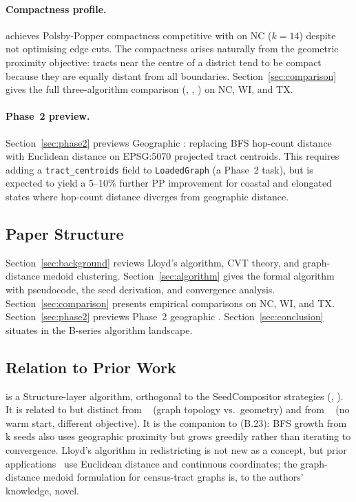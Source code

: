 \paragraph{Compactness profile.}
\cvd{} achieves Polsby-Popper compactness competitive with \metis{}
on NC ($k=14$) despite not optimising edge cuts.
The compactness arises naturally from the geometric proximity objective: tracts
near the centre of a district tend to be compact because they are equally
distant from all boundaries.
Section~\ref{sec:comparison} gives the full three-algorithm comparison
(\cvd{}, \metis{}, \sa{}) on NC, WI, and TX.

\paragraph{Phase~2 preview.}
Section~\ref{sec:phase2} previews Geographic \cvd{}: replacing BFS hop-count
distance with Euclidean distance on EPSG:5070 projected tract centroids.
This requires adding a \texttt{tract\_centroids} field to \texttt{LoadedGraph}
(a Phase~2 task), but is expected to yield a 5--10\% further PP improvement
for coastal and elongated states where hop-count distance diverges from
geographic distance.

\subsection{Paper Structure}

Section~\ref{sec:background} reviews Lloyd's algorithm, CVT theory, and
graph-distance medoid clustering.
Section~\ref{sec:algorithm} gives the formal \cvd{} algorithm with pseudocode,
the seed derivation, and convergence analysis.
Section~\ref{sec:comparison} presents empirical comparisons on NC, WI, and TX.
Section~\ref{sec:phase2} previews Phase~2 geographic \cvd{}.
Section~\ref{sec:conclusion} situates \cvd{} in the B-series algorithm landscape.

\subsection{Relation to Prior Work}

\cvd{} is a Structure-layer algorithm, orthogonal to the SeedCompositor
strategies (\cs{}, \be{}).
It is related to but distinct from \metis{}~\citep{karypis1998} (graph
topology vs.\ geometry) and from \sa{}~\citep{b19paper} (no warm start,
different objective).
It is the companion to \bfsgrowth{} (B.23): BFS growth from k seeds also
uses geographic proximity but grows greedily rather than iterating to
convergence.
Lloyd's algorithm in redistricting is not new as a concept, but prior
applications~\citep{du1999} use Euclidean distance and continuous coordinates;
the graph-distance medoid formulation for census-tract graphs is, to the
authors' knowledge, novel.
